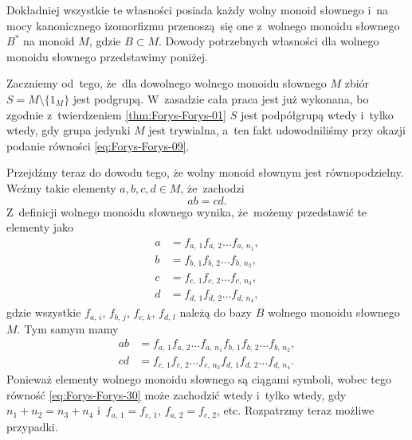 \documentclass[a4paper,11pt]{article}
\begin{document}
Dokładniej wszystkie te własności posiada każdy wolny monoid słownego
i~na mocy kanonicznego izomorfizmu przenoszą~się one z~wolnego monoidu
słownego $B^{ * }$ na monoid $M$, gdzie $B \subset M$. Dowody
potrzebnych własności dla wolnego monoidu słownego przedstawimy
poniżej.

Zaczniemy od~tego, że~dla dowolnego wolnego monoidu słownego $M$ zbiór
$S = M \setminus \{ 1_{ M } \}$ jest podgrupą. W~zasadzie cała praca
jest już wykonana, bo zgodnie z~twierdzeniem \ref{thm:Forys-Forys-01}
$S$ jest podpółgrupą wtedy i~tylko wtedy, gdy grupa jedynki $M$ jest
trywialna, a~ten fakt udowodniliśmy przy okazji podanie równości
\eqref{eq:Forys-Forys-09}.

Przejdźmy teraz do dowodu tego, że wolny monoid słownym jest
równopodzielny. Weźmy takie elementy $a, b, c, d \in M$, że~zachodzi
\begin{equation}
  \label{eq:Forys-Forys-39}
  a b = c d.
\end{equation}
Z~definicji wolnego monoidu słownego wynika, że~możemy przedstawić te
elementy jako
\begin{subequations}
  \begin{align}
    \label{eq:Forys-Forys-40-A}
    a &= f_{ a,\, 1 } f_{ a,\, 2 } \ldots f_{ a,\, n_{ 1 } }, \\
    \label{eq:Forys-Forys-40-B}
    b &= f_{ b,\, 1 } f_{ b,\, 2 } \ldots f_{ b,\, n_{ 2 } }, \\
    \label{eq:Forys-Forys-40-C}
    c &= f_{ c,\, 1 } f_{ c,\, 2 } \ldots f_{ c,\, n_{ 3 } }, \\
    \label{eq:Forys-Forys-40-D}
    d &= f_{ d,\, 1 } f_{ d,\, 2 } \ldots f_{ d,\, n_{ 4 } },
  \end{align}
\end{subequations}
gdzie wszystkie $f_{ a,\, i }$, $f_{ b,\, j }$, $f_{ c,\, k }$,
$f_{ d,\, l }$ należą do bazy $B$ wolnego monoidu słownego~$M$. Tym
samym mamy
\begin{subequations}
  \begin{align}
    \label{eq:Forys-Forys-41-A}
    a b
    &=
      f_{ a,\, 1 } f_{ a,\, 2 } \ldots f_{ a,\, n_{ 1 } } f_{ b,\, 1 }
      f_{ b,\, 2 } \ldots f_{ b,\, n_{ 2 } }, \\
    \label{eq:Forys-Forys-41-B}
    cd
    &=
      f_{ c,\, 1 } f_{ c,\, 2 } \ldots f_{ c,\, n_{ 3 } } f_{ d,\, 1 }
      f_{ d,\, 2 } \ldots f_{ d,\, n_{ 4 } }.
  \end{align}
\end{subequations}
Ponieważ elementy wolnego monoidu słownego są ciągami symboli, wobec
tego równość \eqref{eq:Forys-Forys-30} może zachodzić wtedy i~tylko
wtedy, gdy $n_{ 1 } + n_{ 2 } = n_{ 3 } + n_{ 4 }$
i~$f_{ a,\, 1 } = f_{ c,\, 1 }$, $f_{ a,\, 2 } = f_{ c,\, 2 }$, etc.
Rozpatrzmy teraz możliwe przypadki.
\end{document}

